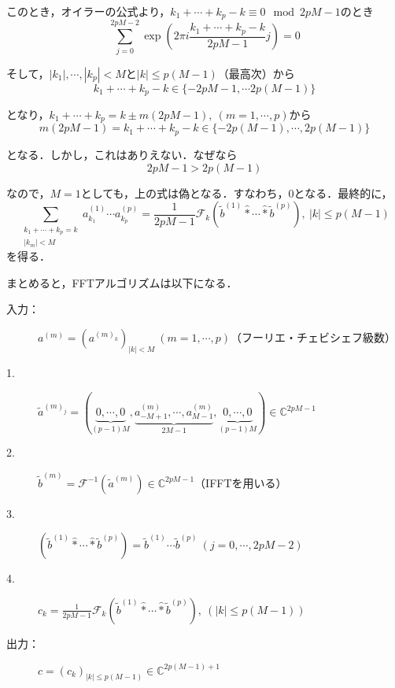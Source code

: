 \documentclass[11pt,a4paper,titlepage]{jsreport}
\theoremstyle{definition}
\begin{document}
\begin{description}
    このとき，オイラーの公式より，$k_1+\cdots+k_p-k \equiv 0 \mod 2pM-1$のとき
    \begin{equation*}
      \sum_{j=0}^{2pM-2} \exp(2\pi i \frac{k_1+\cdots+k_p-k}{2pM-1}j) = 0
    \end{equation*}

    そして，$|k_1|,\cdots,|k_p|<M$と$|k|\leq p(M-1)$（最高次）から
    \begin{equation*}
      k_1+\cdots+k_p-k \in \{ -2pM-1, \cdots 2p(M-1) \}
    \end{equation*}

    となり，$k_1+\cdots+k_p = k \pm m(2pM-1),\ (m=1,\cdots, p)$から
    \begin{equation*}
      m(2pM-1) = k_1 + \cdots + k_p - k \in \{ -2p(M-1),\cdots, 2p(M-1)\}
    \end{equation*}

    となる．しかし，これはありえない．なぜなら
    \begin{equation*}
      2pM-1 > 2p(M-1)
    \end{equation*}

    なので，$M=1$としても，上の式は偽となる．すなわち，$0$となる．最終的に，
    \begin{equation*}
      \sum_{\substack{k_1+\cdots+k_p=k \\ |k_m|<M}} a_{k_1}^{(1)}\cdots a_{k_p}^{(p)} = \frac{1}{2pM-1}\mathcal{F}_k \left( \tilde{b}^{(1)} \hat* \cdots \hat* \tilde{b}^{(p)} \right),\ |k|\leq p(M-1)
    \end{equation*}
    を得る．
\end{description}

まとめると，FFTアルゴリズムは以下になる．
\begin{screen}
  \begin{description}
    \item[入力：]$a^{(m)}=\left( a^{(m)_k} \right)_{|k|<M}\ (m=1,\cdots,p)$（フーリエ・チェビシェフ級数）
    \item[1.] $\tilde{a}^{(m)_j} = \left( \underbrace{0,\cdots,0}_{(p-1)M}, \underbrace{a_{-M+1}^{(m)},\cdots,a_{M-1}^{(m)}}_{2M-1},\underbrace{{0,\cdots,0}}_{(p-1)M}\right) \in \mathbb{C}^{2pM-1}$
    \item[2.] $\tilde{b}^{(m)}=\mathcal{F}^{-1} (\tilde{a}^{(m)}) \in \mathbb{C}^{2pM-1}$（IFFTを用いる）
    \item[3.] $\left( \tilde{b}^{(1)} \hat* \cdots \hat* \tilde{b}^{(p)} \right) = \tilde{b}^{(1)} \cdots \tilde{b}^{(p)}\ \left(j=0,\cdots,2pM-2\right)$
    \item[4.] $c_k = \frac{1}{2pM-1} \mathcal{F}_k \left( \tilde{b}^{(1)} \hat* \cdots \hat* \tilde{b}^{(p)} \right),\ (|k| \leq p(M-1))$
    \item[出力：] $c=\left( c_k \right)_{|k|\leq p(M-1)} \in \mathbb{C}^{2p(M-1)+1}$
  \end{description}
\end{screen}
 \newpage 
 \newpage 
\end{document}
